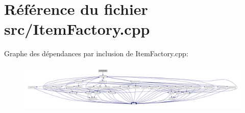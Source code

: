 \section{Référence du fichier src/\-Item\-Factory.cpp}
\label{_item_factory_8cpp}
Graphe des dépendances par inclusion de Item\-Factory.\-cpp\-:\nopagebreak
\begin{figure}[H]
\begin{center}
\leavevmode
\includegraphics[width=350pt]{_item_factory_8cpp__incl}
\end{center}
\end{figure}
